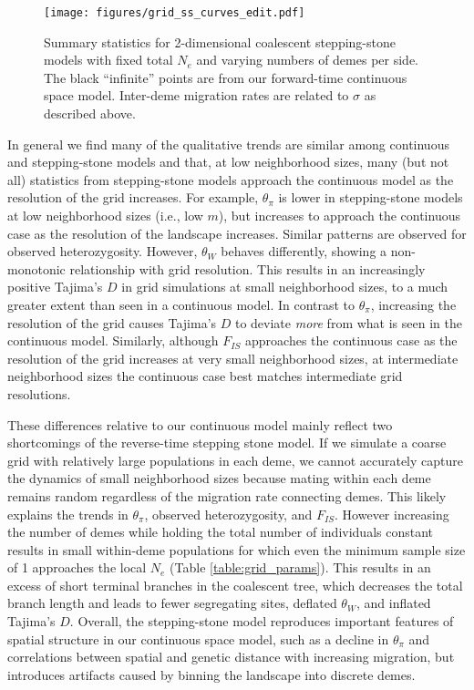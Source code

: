 \documentclass[10pt,twoside,lineno,hidelinks]{preprint}
\begin{document}
\begin{figure}[h]
\centering
\texttt{[image: figures/grid\_ss\_curves\_edit.pdf]}
\caption{Summary statistics for 2-dimensional coalescent stepping-stone models with fixed total $N_{e}$ and varying numbers of demes per side. The black ``infinite'' points are from our forward-time continuous space model. Inter-deme migration rates are related to $\sigma$ as described above.}
\label{fig:grid_stats}
\end{figure}

In general we find many of the qualitative trends are similar among continuous and stepping-stone models and that, at low neighborhood sizes, many  (but not all) statistics from stepping-stone models approach the continuous model as the resolution of the grid increases.
For example, $\theta_\pi$ is lower in stepping-stone models 
at low neighborhood sizes (i.e., low $m$),
but increases to approach the continuous case as the resolution of the landscape increases.
Similar patterns are observed for observed heterozygosity. However, $\theta_{W}$ behaves differently, showing a non-monotonic relationship with grid resolution.
This results in an increasingly positive Tajima's $D$ in grid simulations at small neighborhood sizes, to a much greater extent than seen in a continuous model. In contrast to $\theta_\pi$, increasing the resolution of the grid causes Tajima's $D$ to deviate \emph{more} from what is seen in the continuous model. 
Similarly, although $F_{IS}$ approaches the continuous case as the resolution of the grid increases at very small neighborhood sizes,
at intermediate neighborhood sizes the continuous case best matches intermediate grid resolutions.
 
These differences relative to our continuous model mainly reflect two shortcomings of the reverse-time stepping stone model. If we simulate a coarse grid with relatively large populations in each deme, we cannot accurately capture the dynamics of small neighborhood sizes because mating within each deme remains random regardless of the migration rate connecting demes. This likely explains the trends in $\theta_{\pi}$, observed heterozygosity, and $F_{IS}$. However increasing the number of demes while holding the total number of individuals constant results in small within-deme populations for which even the minimum sample size of 1 approaches the local $N_e$ (Table \ref{table:grid_params}). This results in an excess of short terminal branches in the coalescent tree, which decreases the total branch length and leads to fewer segregating sites, deflated $\theta_W$, and inflated Tajima's $D$. Overall, the stepping-stone model reproduces important features of spatial structure in our continuous space model, such as a decline in $\theta_\pi$ and correlations between spatial and genetic distance with increasing migration, but introduces artifacts caused by binning the landscape into discrete demes. 
\end{document}
